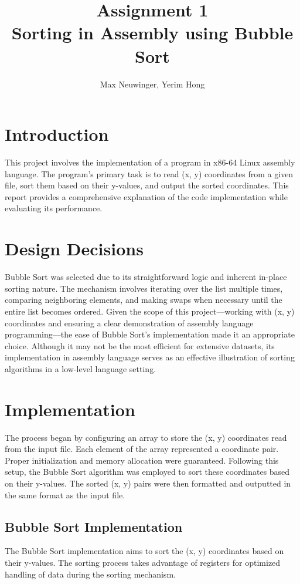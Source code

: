 \documentclass[12pt,a4paper]{article}
\title{Assignment 1\\Sorting in Assembly using Bubble Sort}
\author{Max Neuwinger, Yerim Hong}
\date{}
\begin{document}
\maketitle

\section{Introduction}
This project involves the implementation of a program in x86-64 Linux assembly language. The program's primary task is to read (x, y) coordinates from a given file, sort them based on their y-values, and output the sorted coordinates. This report provides a comprehensive explanation of the code implementation while evaluating its performance.

\section{Design Decisions}
Bubble Sort was selected due to its straightforward logic and inherent in-place sorting nature. The mechanism involves iterating over the list multiple times, comparing neighboring elements, and making swaps when necessary until the entire list becomes ordered. Given the scope of this project—working with (x, y) coordinates and ensuring a clear demonstration of assembly language programming—the ease of Bubble Sort's implementation made it an appropriate choice. Although it may not be the most efficient for extensive datasets, its implementation in assembly language serves as an effective illustration of sorting algorithms in a low-level language setting.

\section{Implementation}
The process began by configuring an array to store the (x, y) coordinates read from the input file. Each element of the array represented a coordinate pair. Proper initialization and memory allocation were guaranteed. Following this setup, the Bubble Sort algorithm was employed to sort these coordinates based on their y-values. The sorted (x, y) pairs were then formatted and outputted in the same format as the input file.

\subsection{Bubble Sort Implementation}

The Bubble Sort implementation aims to sort the (x, y) coordinates based on their y-values. The sorting process takes advantage of registers for optimized handling of data during the sorting mechanism.
\end{document}
